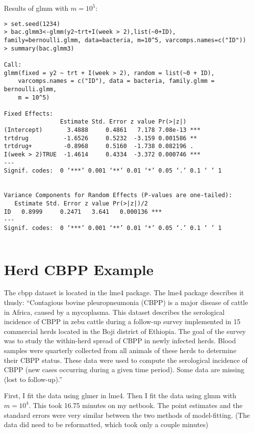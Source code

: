 \documentclass{article}
\begin{document}
Results  of glmm with $m=10^5$:
\begin{verbatim}
> set.seed(1234)
> bac.glmm3<-glmm(y2~trt+I(week > 2),list(~0+ID), family=bernoulli.glmm, data=bacteria, m=10^5, varcomps.names=c("ID"))
> summary(bac.glmm3)

Call:
glmm(fixed = y2 ~ trt + I(week > 2), random = list(~0 + ID), 
    varcomps.names = c("ID"), data = bacteria, family.glmm = bernoulli.glmm, 
    m = 10^5)

Fixed Effects:
                Estimate Std. Error z value Pr(>|z|)    
(Intercept)       3.4888     0.4861   7.178 7.08e-13 ***
trtdrug          -1.6526     0.5232  -3.159 0.001586 ** 
trtdrug+         -0.8968     0.5160  -1.738 0.082196 .  
I(week > 2)TRUE  -1.4614     0.4334  -3.372 0.000746 ***
---
Signif. codes:  0 ‘***’ 0.001 ‘**’ 0.01 ‘*’ 0.05 ‘.’ 0.1 ‘ ’ 1


Variance Components for Random Effects (P-values are one-tailed):
   Estimate Std. Error z value Pr(>|z|)/2    
ID   0.8999     0.2471   3.641   0.000136 ***
---
Signif. codes:  0 ‘***’ 0.001 ‘**’ 0.01 ‘*’ 0.05 ‘.’ 0.1 ‘ ’ 1


\end{verbatim}

\section{Herd CBPP Example}
The cbpp dataset is located in the lme4 package. The lme4 package describes it thusly: ``Contagious bovine pleuropneumonia (CBPP) is a major disease of cattle in Africa, caused by a
mycoplasma. This dataset describes the serological incidence of CBPP in zebu cattle during a
follow-up survey implemented in 15 commercial herds located in the Boji district of Ethiopia. The
goal of the survey was to study the within-herd spread of CBPP in newly infected herds. Blood
samples were quarterly collected from all animals of these herds to determine their CBPP status.
These data were used to compute the serological incidence of CBPP (new cases occurring during a given time period). Some data are missing (lost to follow-up).''

First, I fit the data using glmer in lme4. Then I fit the data using glmm with $m=10^4$. This took 16.75 minutes on my netbook. The point estimates and the standard errors were very similar between the two  methods of model-fitting. (The data did need to be reformatted, which took only a couple minutes)
\end{document}
